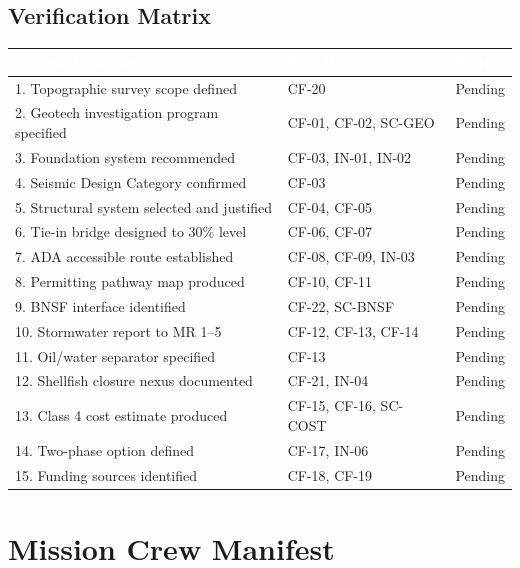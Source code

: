 \documentclass[11pt,letterpaper]{article}
\newcommand{\tableheader}[1]{\textbf{\sffamily\textcolor{white}{#1}}}
\begin{document}
\subsection{Verification Matrix}

\begin{center}
\begin{tabularx}{\textwidth}{XL{3.5cm}C{1.5cm}}
\toprule
{}
\tableheader{Success Criterion} & \tableheader{Test ID(s)} & \tableheader{Status} \\
. Topographic survey scope defined & CF-20 & Pending \\
2. Geotech investigation program specified & CF-01, CF-02, SC-GEO & Pending \\
3. Foundation system recommended & CF-03, IN-01, IN-02 & Pending \\
4. Seismic Design Category confirmed & CF-03 & Pending \\
5. Structural system selected and justified & CF-04, CF-05 & Pending \\
6. Tie-in bridge designed to 30\% level & CF-06, CF-07 & Pending \\
7. ADA accessible route established & CF-08, CF-09, IN-03 & Pending \\
8. Permitting pathway map produced & CF-10, CF-11 & Pending \\
9. BNSF interface identified & CF-22, SC-BNSF & Pending \\
10. Stormwater report to MR 1--5 & CF-12, CF-13, CF-14 & Pending \\
11. Oil/water separator specified & CF-13 & Pending \\
12. Shellfish closure nexus documented & CF-21, IN-04 & Pending \\
13. Class 4 cost estimate produced & CF-15, CF-16, SC-COST & Pending \\
14. Two-phase option defined & CF-17, IN-06 & Pending \\
15. Funding sources identified & CF-18, CF-19 & Pending \\
\bottomrule
\end{tabularx}
\end{center}

\section{Mission Crew Manifest}
\end{document}
